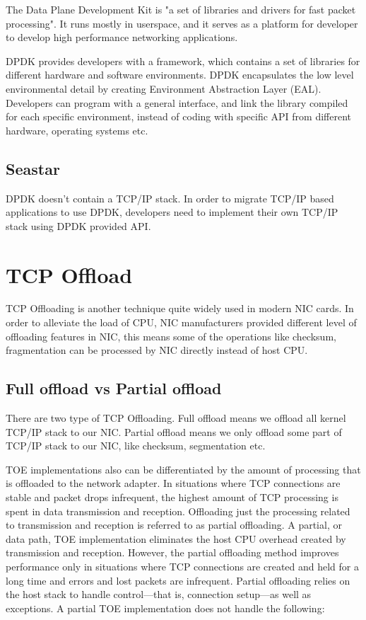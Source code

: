 \documentclass[bsc,frontabs,twoside,singlespacing,parskip,deptreport]{infthesis}     %
\begin{document}
The Data Plane Development Kit is "a set of libraries and drivers for fast packet processing"\cite{dpdk}. It runs mostly in userspace, and it serves as a platform for developer to develop high performance networking applications.



DPDK provides developers with a framework, which contains a set of libraries for different hardware and software environments. DPDK encapsulates the low level environmental detail by creating Environment Abstraction Layer (EAL). Developers can program with a general interface, and link the library compiled for each specific environment, instead of coding with specific API from different hardware, operating systems etc.





\subsection{Seastar}
DPDK doesn't contain a TCP/IP stack. In order to migrate TCP/IP based applications to use DPDK, developers need to implement their own TCP/IP stack using DPDK provided API. 



\section{TCP Offload}
TCP Offloading is another technique quite widely used in modern NIC cards. In order to alleviate the load of CPU, NIC manufacturers provided different level of offloading features in NIC, this means some of the operations like checksum, fragmentation can be processed by NIC directly instead of host CPU. 


\subsection{Full offload vs Partial offload}


There are two type of TCP Offloading. Full offload means we offload all kernel TCP/IP stack to our NIC. Partial offload means we only offload some part of TCP/IP stack to our NIC, like checksum, segmentation etc. 



TOE implementations also can be differentiated by the amount of processing that is offloaded to the network adapter. In situations where TCP connections are stable and packet drops infrequent, the highest amount of TCP processing is spent in data transmission and reception. Offloading just the processing related to transmission and reception is referred to as partial offloading. A partial, or data path, TOE implementation eliminates the host CPU overhead created by transmission and reception. However, the partial offloading method improves performance only in situations where TCP connections are created and held for a long time and errors and lost packets are infrequent. Partial offloading relies on the host stack to handle control—that is, connection setup—as well as exceptions. A partial TOE implementation does not handle the following:
\end{document}
